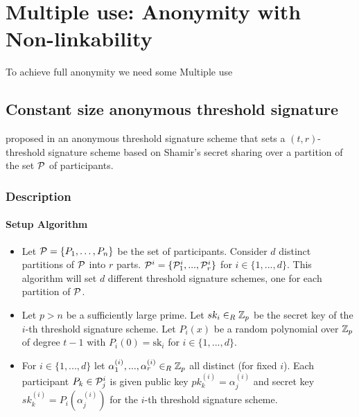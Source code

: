 \chapter{Multiple use: Anonymity with Non-linkability}
\label{chap:mult}
To achieve full anonymity we need some 
Multiple use 


\section{Constant size anonymous threshold signature}
\citeauthor*{DazaDSV09} proposed in \cite{DazaDSV09} an anonymous threshold signature scheme that sets a $(t,r)$-threshold signature scheme based on Shamir's secret sharing over a partition of the set ${\mathcal P}$ of participants.

\subsection{Description}
\subsubsection*{Setup Algorithm}
\begin{itemize}[align = left, leftmargin=*, label={--}]
\item Let ${\mathcal P} = \{P_1 , \dots , P_n \}$ be the set of participants. Consider $d$ distinct partitions of ${\mathcal P}$ into $r$ parts.
${\mathcal P}^i = \{{\mathcal P}^i_1, ... , {\mathcal P}^i_r\}$ for $i \in \{1, ... , d\}$. This algorithm will set $d$ different threshold signature schemes, one for each partition of ${\mathcal P}$.

\item Let $p > n$ be a sufficiently large prime. Let $sk_i \in_R {\mathbb Z}_p$ be the secret key of the $i$-th threshold signature scheme. Let $P_i(x)$ be a random polynomial over ${\mathbb Z}_p$ of degree $t-1$ with ${P_i(0) = \mbox{sk}_i}$ for $i \in \{1, ..., d\}$.

\item For $i \in \{1, ..., d\}$ let $\alpha^{(i)}_1, ... , \alpha^{(i)}_r \in_R {\mathbb Z}_p$ all distinct (for fixed $i$). Each participant $P_k \in {\mathcal P}^i_j$ is given public key $pk^{(i)}_k = \alpha^{(i)}_j$ and secret key $sk^{(i)}_k = P_i(\alpha^{(i)}_j)$ for the $i$-th threshold signature scheme. 
\end{itemize}

